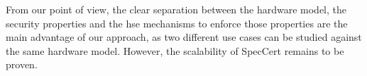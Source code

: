 From our point of view, the clear separation between the hardware model, the
security properties and the \ac{hse} mechanisms to enforce those properties are
the main advantage of our approach, as two different use cases can be studied
against the same hardware model.
%
However, the scalability of SpecCert remains to be proven.
